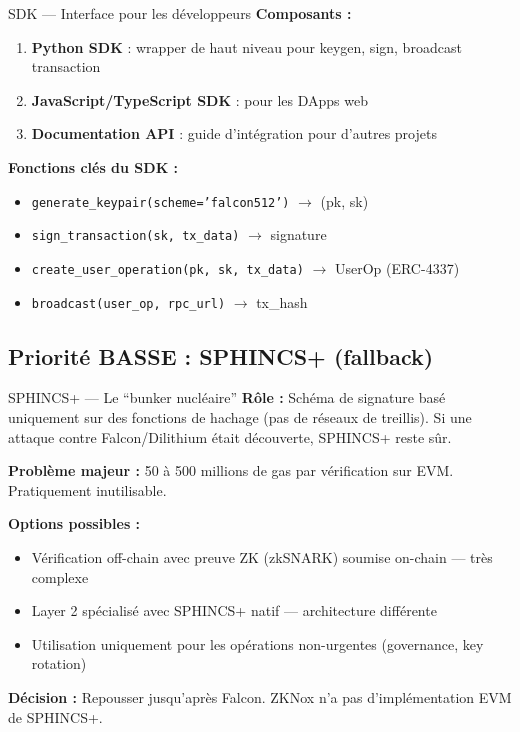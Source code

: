 \documentclass[12pt, a4paper]{article}
\begin{document}
\begin{todo}{SDK --- Interface pour les développeurs}
\textbf{Composants :}
\begin{enumerate}
  \item \textbf{Python SDK} : wrapper de haut niveau pour keygen, sign, broadcast transaction
  \item \textbf{JavaScript/TypeScript SDK} : pour les DApps web
  \item \textbf{Documentation API} : guide d'intégration pour d'autres projets
\end{enumerate}

\textbf{Fonctions clés du SDK :}
\begin{itemize}
  \item \texttt{generate\_keypair(scheme='falcon512')} $\to$ (pk, sk)
  \item \texttt{sign\_transaction(sk, tx\_data)} $\to$ signature
  \item \texttt{create\_user\_operation(pk, sk, tx\_data)} $\to$ UserOp (ERC-4337)
  \item \texttt{broadcast(user\_op, rpc\_url)} $\to$ tx\_hash
\end{itemize}
\end{todo}

\subsection{Priorité BASSE : SPHINCS+ (fallback)}

\begin{todo}{SPHINCS+ --- Le ``bunker nucléaire''}
\textbf{Rôle :} Schéma de signature basé uniquement sur des fonctions de hachage (pas de réseaux de treillis).
Si une attaque contre Falcon/Dilithium était découverte, SPHINCS+ reste sûr.

\textbf{Problème majeur :} 50 à 500 millions de gas par vérification sur EVM. Pratiquement inutilisable.

\textbf{Options possibles :}
\begin{itemize}
  \item Vérification off-chain avec preuve ZK (zkSNARK) soumise on-chain --- très complexe
  \item Layer 2 spécialisé avec SPHINCS+ natif --- architecture différente
  \item Utilisation uniquement pour les opérations non-urgentes (governance, key rotation)
\end{itemize}

\textbf{Décision :} Repousser jusqu'après Falcon. ZKNox n'a pas d'implémentation EVM de SPHINCS+.
\end{todo}
\end{document}
